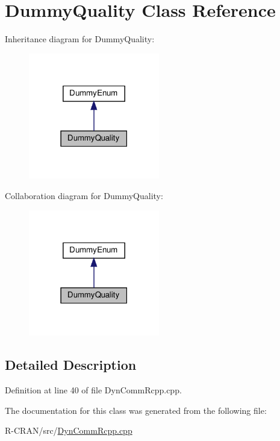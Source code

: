 \hypertarget{classDummyQuality}{}\section{Dummy\+Quality Class Reference}
\label{classDummyQuality}


Inheritance diagram for Dummy\+Quality\+:
\nopagebreak
\begin{figure}[H]
\begin{center}
\leavevmode
\includegraphics[width=162pt]{classDummyQuality__inherit__graph}
\end{center}
\end{figure}


Collaboration diagram for Dummy\+Quality\+:
\nopagebreak
\begin{figure}[H]
\begin{center}
\leavevmode
\includegraphics[width=162pt]{classDummyQuality__coll__graph}
\end{center}
\end{figure}


\subsection{Detailed Description}


Definition at line 40 of file Dyn\+Comm\+Rcpp.\+cpp.



The documentation for this class was generated from the following file\+:\begin{DoxyCompactItemize}
\item 
R-\/\+C\+R\+A\+N/src/\hyperlink{DynCommRcpp_8cpp}{Dyn\+Comm\+Rcpp.\+cpp}\end{DoxyCompactItemize}
